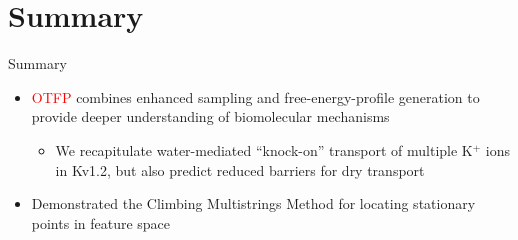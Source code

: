 \documentclass[10pt]{beamer}
\begin{document}



% 
% 
% 
% 

% 

% 

% 

% 

% 

% 

% 

\section{Summary}

\begin{frame}[fragile]{Summary}
  \begin{itemize}
  \item \textcolor{red}{OTFP} combines enhanced sampling and free-energy-profile generation to provide deeper understanding of biomolecular mechanisms
  \begin{itemize}
  \item We recapitulate water-mediated ``knock-on'' transport of multiple K$^+$ ions in Kv1.2, but also predict reduced barriers for dry transport
  \end{itemize}
  \item Demonstrated the \textcolor{magenta!80!black}{Climbing Multistrings Method} for locating stationary points in feature space
  \end{itemize}
  \end{frame}


\end{document}
